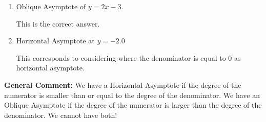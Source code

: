 \documentclass{extbook}[14pt]
\begin{document}
\begin{enumerate}
{\begin{enumerate}[label=\Alph*.]
This corresponds to believing there can be both a horizontal and oblique asymptote.
\item \( \text{Oblique Asymptote of } y = 2x -3. \)

This is the correct answer.
\item \( \text{Horizontal Asymptote at } y = -2.0 \)

This corresponds to considering where the denominator is equal to 0 as horizontal asymptote.
\end{enumerate}

\textbf{General Comment:} We have a Horizontal Asymptote if the degree of the numerator is smaller than or equal to the degree of the denominator. We have an Oblique Asymptote if the degree of the numerator is larger than the degree of the denominator. We cannot have both!
}
\end{enumerate}
\end{document}
